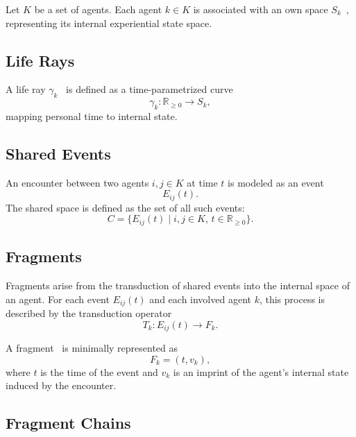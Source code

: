 \documentclass[12pt,a4paper]{article}
\begin{document}
Let $K$ be a set of agents.
Each agent $k \in K$ is associated with an own space $S_k$~, representing its internal experiential state space.

\subsection{Life Rays}

A life ray $\gamma_k$~ is defined as a time-parametrized curve
\begin{equation}
\gamma_k : \mathbb{R}_{\ge 0} \to S_k,
\end{equation}
mapping personal time to internal state.

\subsection{Shared Events}

An encounter between two agents $i,j \in K$ at time $t$ is modeled as an event~
\begin{equation}
E_{ij}(t).
\end{equation}
The shared space is defined as the set of all such events:
\[
C = \{ E_{ij}(t) \mid i,j \in K,\, t \in \mathbb{R}_{\ge 0} \}.
\]

\subsection{Fragments}

Fragments arise from the transduction of shared events into the internal space of an
agent. For each event $E_{ij}(t)$ and each involved agent $k$, this process is described
by the transduction operator~
\[
T_k : E_{ij}(t) \longrightarrow F_k .
\]

A fragment~
is minimally represented as
\begin{equation}
F_k = (t, v_k),
\end{equation}
where $t$ is the time of the event and $v_k$ is an imprint of the agent’s internal state
induced by the encounter.

\subsection{Fragment Chains}
\end{document}
